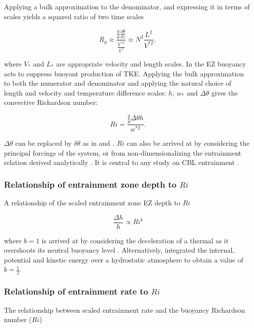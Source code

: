 Applying a bulk approximation to the denominator, and expressing it in terms of scales yields a squared ratio of two time scales

\begin{equation}
\label{eq:gradri}
R_{g} \approx \frac{\frac{g}{\overline{\theta}} \frac{\partial \overline{\theta}}{\partial z}}{\frac{V^{*2}}{L^{2}}} \approx N^{2}\frac{L^{2}}{V^{*2}},
\end{equation}

where $V_{*}$ and $L_{*}$ are appropriate velocity and length scales.  In the EZ buoyancy acts to suppress buoyant production of TKE. Applying the bulk approximation to both the numerator and denominator and applying the natural choice of length and velocity and temperature difference scales: $h$, $w_{*}$ and $\Delta \theta$ gives the convective Richardson number:

\begin{equation}
Ri = \frac{\frac{g}{\overline{\theta}} \Delta \theta h}{w^{*2}}.
\end{equation}

$\Delta \theta$ can be replaced by $\delta \theta$ as in \cite{FedConzMir04} and \cite{GarciaMellado}.  $Ri$ can also be arrived at by considering the principal forcings of the system, or from non-dimensionalizing the entrainment relation derived analytically \citep{Tennekes73, Deardorff72}. It is central to any study on CBL entrainment \citep{SullMoengStev, FedConzMir04, Traum11, BrooksFowler2}.


\subsubsection{Relationship of entrainment zone depth to $Ri$}

A relationship of the scaled entrainment zone EZ depth to $Ri$

\begin{equation}\label{eq:dhvsri}
\frac{\Delta h}{h} \propto Ri ^{b}
\end{equation}

 where $b=1$ is arrived at by considering the deceleration of a thermal
as it overshoots its neutral buoyancy level \cite{StullNelEl}.  Alternatively, \cite{Boers89} integrated the internal, potential and kinetic energy over a hydrostatic atmosphere to obtain a value of $b=\frac{1}{2}$.

\subsubsection{Relationship of entrainment rate to $Ri$}
\label{subsec:erri}
The relationship between scaled entrainment rate and the buoyancy Richardson number ($Ri$)

